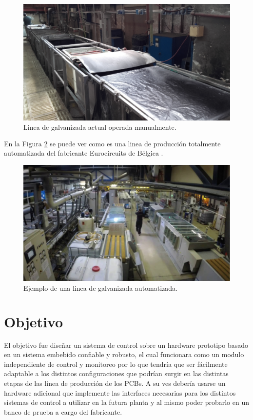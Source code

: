 \begin{figure}[h]
	\centering
	\includegraphics[width=.8\textwidth]{Figures/Cap_1/planta_actual}
	\caption{Linea de galvanizada actual operada manualmente.}
	\label{fig:planta_actual}
\end{figure}

En la Figura \ref{fig:planta_moderna} se puede ver como es una linea de producción totalmente automatizada del fabricante Eurocircuits de Bélgica \footnotemark.

\begin{figure}[h]
	\centering
	\includegraphics[width=.8\textwidth]{Figures/Cap_1/planta_moderna}
	\caption{ Ejemplo de una linea de galvanizada automatizada.}
	\label{fig:planta_moderna}
\end{figure}

\section{ Objetivo }

El objetivo fue diseñar un sistema de control sobre un hardware prototipo basado en un sistema embebido confiable y robusto, el cual funcionara como un modulo independiente de control y monitoreo por lo que tendría que ser fácilmente adaptable a los distintos configuraciones que podrían surgir en las distintas etapas de las linea de producción de los PCBs.
A su ves debería usarse un hardware adicional que implemente las interfaces necesarias para los distintos sistemas de control a utilizar en la futura planta y al mismo poder probarlo en un banco de prueba a cargo del fabricante.

